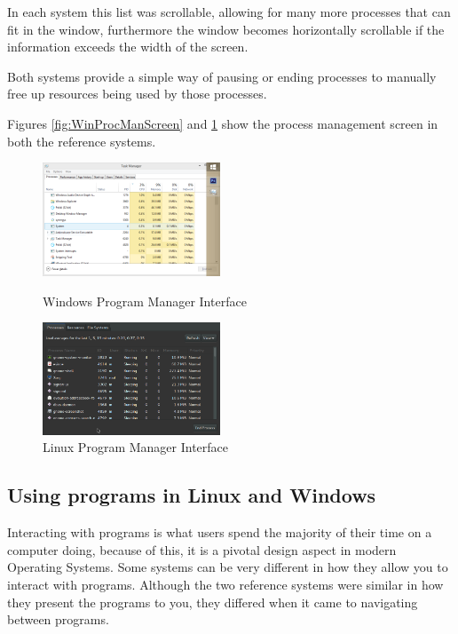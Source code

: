 \documentclass[a4paper]{report}
\begin{document}
In each system this list was scrollable, allowing for many more processes that can fit in the window, furthermore the window becomes horizontally scrollable if the information exceeds the width of the screen.

Both systems provide a simple way of pausing or ending processes to manually free up resources being used by those processes.

Figures \ref{fig:WinProcManScreen} and \ref{fig:LinProcManScreen} show the process management screen in both the reference systems.

\begin{figure}[ht]
\centering
\begin{minipage}{.5\textwidth}
  \centering
  \includegraphics[width=200px]{images/Windows_Program_Manager_Screenshot}
  \caption{Windows Program Manager Interface}
  \label{fig:WinProcManScreen}
\end{minipage}%
\begin{minipage}{.5\textwidth}
  \centering
  \includegraphics[width=200px]{images/Linux_Program_Manager_Screenshot}
  \caption{Linux Program Manager Interface}
  \label{fig:LinProcManScreen}
\end{minipage}
\end{figure}


\subsection{Using programs in Linux and Windows}

Interacting with programs is what users spend the majority of their time on a computer doing, because of this, it is a pivotal design aspect in modern Operating Systems. Some systems can be very different in how they allow you to interact with programs. Although the two reference systems were similar in how they present the programs to you, they differed when it came to navigating between programs.
\end{document}
